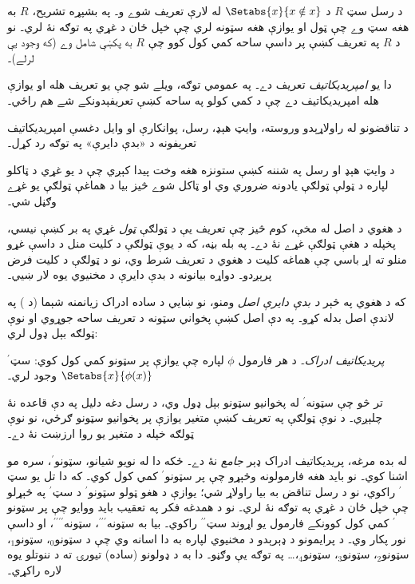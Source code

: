\documentclass[../../../include/open-logic-section]{subfiles}
\begin{document}


د رسل سټ $R$ د $\Setabs{x}{x \notin
x}$ له لارې تعريف شوے و۔ په بشپړه تشريح، $R$ به هغه سټ وے
چې ټول او يوازې هغه سټونه لري چې خپل ځان د غړي په توګه نۀ
لري۔ نو د $R$ په تعريف کښې پر داسې ساحه کمي کول کوو چې $R$ به
پکښې شامل وے (که وجود يې لرلے)۔

دا يو \emph{امپريديکاتيف} تعريف دے۔ په عمومي توګه، ويلے شو
چې يو تعريف هله او يوازې هله امپريديکاتيف دے چې د
کمي کولو په ساحه کښې تعريفېدونکے شے هم راځي۔

د تناقضونو له راولاړېدو وروسته، وايټ هېډ، رسل، پوانکارې او
وايل دغسې امپريديکاتيف تعريفونه د «بدې دايرې» په توګه رد کړل۔
\begin{explain}
  د وايټ هېډ او رسل په شننه کښې ستونزه هغه وخت پيدا کېږي
  چې د يو غړي د ټاکلو لپاره د ټولې ټولګې يادونه ضروري وي
  او ټاکل شوے څيز بيا د هماغې ټولګې يو غړے وګڼل شي۔

  د هغوي د اصل له مخې، کوم څيز چې تعريف يې د ټولګې
  \emph{ټول} غړي په بر کښې نيسي، پخپله د هغې ټولګې غړے نۀ
  دے۔ په بله بڼه، که د يوې ټولګې د کليت منل د داسې غړو
  منلو ته اړ باسي چې هماغه کليت د هغوي د تعريف شرط وي،
  نو د ټولګې د کليت فرض پرېږدو۔ دواړه بيانونه د بدې دايرې
  د مخنيوي يوه لار ښيي۔
  \citep[pp.~39--40]{WhiteheadRussell1910}
\end{explain}
که د هغوي په څېر \emph{د بدې دايرې اصل} ومنو، نو ښايي د
ساده ادراک زيانمنه شېما (د )
په لاندې اصل بدله کړو۔ په دې اصل کښې پخواني سټونه د
تعريف ساحه جوړوي او نوې ټولګه بېل ډول لري:

\begin{defish}
\emph{پريديکاتيف ادراک۔} د هر فارمول $\phi$ لپاره چې يوازې پر سټونو کمي کول کوي: سټ$^\prime$ $\Setabs{x}{\phi(x)}$ وجود لري۔
\end{defish}

تر څو چې سټونه$^{\prime}$ له پخوانيو سټونو بېل ډول وي،
د رسل دغه دليل په دې قاعده نۀ چلېږي۔ د نوې ټولګې په تعريف
کښې متغير يوازې پر پخوانيو سټونو ګرځي، نو نوې ټولګه خپله
د متغير يو روا ارزښت نۀ دے۔

له بده مرغه، پريديکاتيف ادراک ډېر \emph{جامع} نۀ دے۔ ځکه
دا له نويو شيانو، سټونو$^\prime$، سره مو اشنا کوي۔ نو بايد
هغه فارمولونه وڅېړو چې پر سټونو$^\prime$ کمي کول کوي۔ که دا
تل يو سټ$^\prime$ راکوي، نو د رسل تناقض به بيا راولاړ شي؛
يوازې د هغو ټولو سټونو$^\prime$ د سټ$^\prime$ په څېړلو چې
خپل ځان د غړي په توګه نۀ لري۔ نو د همدغه فکر په تعقيب بايد
ووايو چې پر سټونو$^\prime$ کمي کول کوونکے فارمول يو اړوند
سټ$^{\prime\prime}$ راکوي۔ بيا به سټونه$^{\prime\prime\prime}$،
سټونه$^{\prime\prime\prime\prime}$، او داسې نور پکار وي۔ د
پرايمونو د ډېرېدو د مخنيوي لپاره به دا اسانه وي چې د
سټونو$_0$، سټونو$_1$، سټونو$_2$، سټونو$_3$، سټونو$_4$،\ldots
په توګه يې وګڼو۔ دا به د ډولونو (ساده) تيورۍ ته د ننوتلو
يوه لاره راکړي۔
\end{document}
